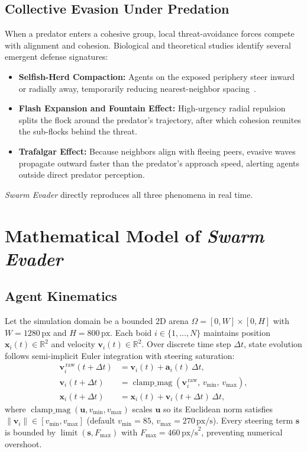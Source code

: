 \documentclass[10pt,twocolumn]{article}
\begin{document}
\subsection{Collective Evasion Under Predation}
When a predator enters a cohesive group, local threat-avoidance forces compete with alignment and cohesion. Biological and theoretical studies identify several emergent defense signatures:
\begin{itemize}
    \item \textbf{Selfish-Herd Compaction:} Agents on the exposed periphery steer inward or radially away, temporarily reducing nearest-neighbor spacing~\cite{hamilton1971geometry}.
    \item \textbf{Flash Expansion and Fountain Effect:} High-urgency radial repulsion splits the flock around the predator's trajectory, after which cohesion reunites the sub-flocks behind the threat.
    \item \textbf{Trafalgar Effect:} Because neighbors align with fleeing peers, evasive waves propagate outward faster than the predator's approach speed, alerting agents outside direct predator perception.
\end{itemize}
\emph{Swarm Evader} directly reproduces all three phenomena in real time.

\section{Mathematical Model of \emph{Swarm Evader}}

\subsection{Agent Kinematics}
Let the simulation domain be a bounded 2D arena $\Omega = [0, W] \times [0, H]$ with $W = 1280\,\text{px}$ and $H = 800\,\text{px}$. Each boid $i \in \{1,\dots,N\}$ maintains position $\mathbf{x}_i(t) \in \mathbb{R}^2$ and velocity $\mathbf{v}_i(t) \in \mathbb{R}^2$. Over discrete time step $\Delta t$, state evolution follows semi-implicit Euler integration with steering saturation:
\begin{align}
    \mathbf{v}_i^{\,\text{raw}}(t + \Delta t) &= \mathbf{v}_i(t) + \mathbf{a}_i(t)\,\Delta t, \\
    \mathbf{v}_i(t + \Delta t) &= \operatorname{clamp\_mag}\!\left(\mathbf{v}_i^{\,\text{raw}},\, v_{\min},\, v_{\max}\right), \\
    \mathbf{x}_i(t + \Delta t) &= \mathbf{x}_i(t) + \mathbf{v}_i(t + \Delta t)\,\Delta t,
\end{align}
where $\operatorname{clamp\_mag}(\mathbf{u}, v_{\min}, v_{\max})$ scales $\mathbf{u}$ so its Euclidean norm satisfies $\|\mathbf{v}_i\| \in [v_{\min}, v_{\max}]$ (default $v_{\min} = 85$, $v_{\max} = 270\,\text{px/s}$). Every steering term $\mathbf{s}$ is bounded by $\operatorname{limit}(\mathbf{s}, F_{\max})$ with $F_{\max} = 460\,\text{px/s}^2$, preventing numerical overshoot.
\end{document}
